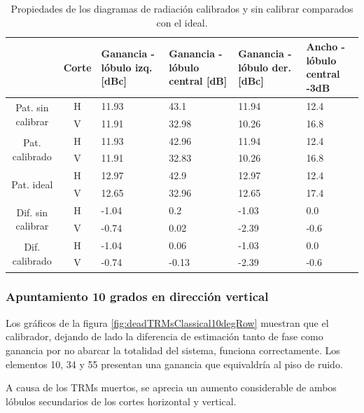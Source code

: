 \begin{table}[H]
  \footnotesize
  \centering
  \begin{tabular}{|c|c|p{2cm}|p{2.5cm}|p{2.5cm}|p{2.5cm}|}
    \cline{2-6}
    \multicolumn{1}{c|}{} & Corte & Ganancia - lóbulo izq. [dBc] & Ganancia - lóbulo central [dB] &
    Ganancia - lóbulo der. [dBc] & Ancho - lóbulo central -3dB \tabularnewline\hline
    \multirow{2}{2cm}{Pat. sin calibrar} & H & 11.93 & 43.1 & 11.94 & 12.4 \tabularnewline\cline{2-6}
     & V & 11.91 & 32.98 & 10.26 & 16.8 \tabularnewline\hline
    \multirow{2}{2cm}{Pat. calibrado} & H & 11.93 & 42.96 & 11.94 & 12.4 \tabularnewline\cline{2-6}
     & V & 11.91 & 32.83 & 10.26 & 16.8 \tabularnewline\hline
    \multirow{2}{2cm}{Pat. ideal} & H & 12.97 & 42.9 & 12.97 & 12.4 \tabularnewline\cline{2-6}
     & V & 12.65 & 32.96 & 12.65 & 17.4 \tabularnewline\hline
    \multirow{2}{2cm}{Dif. sin calibrar} & H & -1.04 & 0.2 & -1.03 & 0.0\tabularnewline\cline{2-6}
     & V & -0.74 & 0.02 & -2.39 & -0.6 \tabularnewline\hline
    \multirow{2}{2cm}{Dif. calibrado} & H & -1.04 & 0.06 & -1.03 & 0.0 \tabularnewline\cline{2-6}
     & V & -0.74 & -0.13 & -2.39 & -0.6 \tabularnewline\hline
  \end{tabular}
  \caption{Propiedades de los diagramas de radiación calibrados y sin calibrar comparados con el ideal.}
  \label{tab:deadTRMsClassical10degCol}
\end{table}


\subsubsection{Apuntamiento 10 grados en dirección vertical}

Los gráficos de la figura \ref{fig:deadTRMsClassical10degRow} muestran que el calibrador, dejando de lado la diferencia de 
estimación tanto de fase como ganancia por no abarcar la totalidad del sistema, funciona correctamente. Los elementos 10, 34 y 
55 presentan una ganancia que equivaldría al piso de ruido.

A causa de los TRMs muertos, se aprecia un aumento considerable de ambos lóbulos secundarios de los cortes horizontal y vertical.

